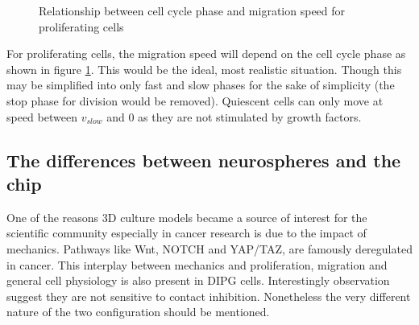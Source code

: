 \documentclass[11pt,a4paper]{article}
\begin{document}
\begin{figure}[ht!]
\vspace{1cm}
\hspace{4cm} 
\caption{Relationship between cell cycle phase and migration speed for proliferating cells \label{vcycle}}
\end{figure}

For proliferating cells, the migration speed will depend on the cell cycle phase as shown in figure \ref{vcycle}. This would be the ideal, most realistic situation. Though this may be simplified into only fast and slow phases  for the sake of simplicity (the stop phase for division would be removed). Quiescent cells can only move at speed between $v_{slow}$ and 0 as they are not stimulated by growth factors.

\subsection{The differences between neurospheres and the chip}
One of the reasons 3D culture models became a source of interest for the scientific community especially in cancer research is due to the impact of mechanics.\cite{Romani2020} Pathways like Wnt, NOTCH and YAP/TAZ, are famously deregulated in cancer. This interplay between mechanics and proliferation, migration  and general cell physiology is also present in DIPG cells. Interestingly observation suggest they are not sensitive to contact inhibition. Nonetheless the very different nature of the two configuration should be mentioned.
\end{document}

